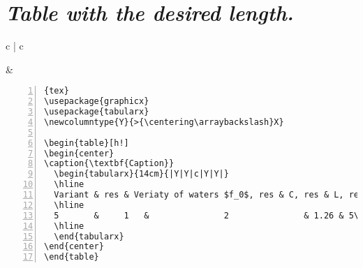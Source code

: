 \section{\textit{Table with the desired length. }}
\begin{table}[h!]
\begin{tabular}{c | c}
\begin{minipage}[m]{0.4\textwidth}
\end{minipage}
&
\begin{minipage}[m]{0.55\textwidth}
\renewcommand\textminus{\mbox{-}}%
\begin{lstlisting}[numberstyle=\zebra{green!15}{yellow!15},numbers=left,basicstyle=\scriptsize]{tex}
\usepackage{graphicx}
\usepackage{tabularx}
\newcolumntype{Y}{>{\centering\arraybackslash}X}

\begin{table}[h!]
\begin{center}
\caption{\textbf{Caption}}
  \begin{tabularx}{14cm}{|Y|Y|c|Y|Y|}
  \hline
  Variant & res & Veriaty of waters $f_0$, res & C, res & L, res\\
  \hline
  5       &     1   &               2               & 1.26 & 5\\
  \hline
  \end{tabularx}
\end{center}
\end{table}
\end{lstlisting}
\end{minipage}
\end{tabular}
\end{table}

